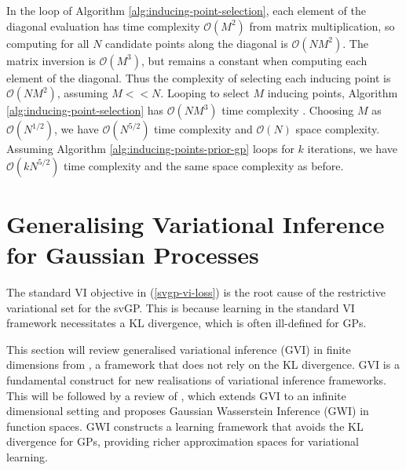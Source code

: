 \documentclass{article}
\numberwithin{equation}{section}
\begin{document}
In the loop of Algorithm \ref{alg:inducing-point-selection}, each element of the diagonal evaluation has time complexity  $\mathcal{O}(M^2)$ from matrix multiplication, so computing for all $N$ candidate points along the diagonal is $\mathcal{O}(NM^2)$.
The matrix inversion is $\mathcal{O}(M^3)$, but remains a constant when computing each element of the diagonal.
Thus the complexity of selecting each inducing point is $\mathcal{O}(NM^2)$, assuming $M << N$.
Looping to select $M$ inducing points, Algorithm \ref{alg:inducing-point-selection} has $\mathcal{O}(NM^3)$ time complexity .
Choosing $M$ as $\mathcal{O}(N^{1/2})$, we have $\mathcal{O}(N^{5/2})$ time complexity  and $\mathcal{O}(N)$ space complexity. 
Assuming Algorithm \ref{alg:inducing-points-prior-gp} loops for $k$ iterations, we have $\mathcal{O}(k N^{5/2})$ time complexity and the same space complexity as before.



\newpage
\section{Generalising Variational Inference for Gaussian Processes}\label{section:gvi-for-gps}
The standard VI objective in (\ref{svgp-vi-loss}) is the root cause of the restrictive variational set for the svGP. 
This is because learning in the standard VI framework necessitates a KL divergence, which is often ill-defined for GPs.

This section will review generalised variational inference (GVI) in finite dimensions from \cite{knoblauch2022optimization}, a framework that does not rely on the KL divergence.
GVI is a fundamental construct for new realisations of variational inference frameworks.
This will be followed by a review of \cite{wild2022generalized}, which extends GVI to an infinite dimensional setting and proposes Gaussian Wasserstein Inference (GWI) in function spaces.
GWI constructs a learning framework that avoids the KL divergence for GPs, providing richer approximation spaces for variational learning.
\end{document}

